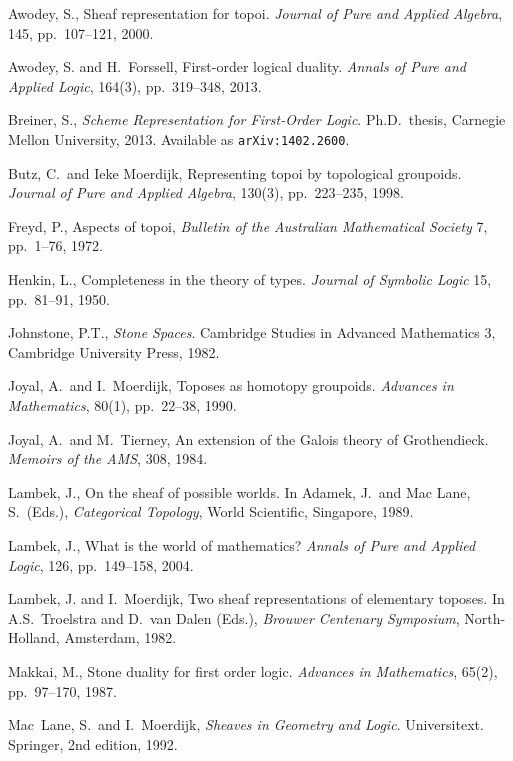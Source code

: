 \documentclass[12pt]{article}
\theoremstyle{remark}
\theoremstyle{definition}
\begin{document}
\begin{thebibliography}{300}

Awodey, S., Sheaf representation for topoi. 
\emph{Journal of Pure and Applied Algebra}, 145, pp.~107--121, 2000.

Awodey, S. and H.~Forssell, First-order logical duality. 
\emph{Annals of Pure and Applied Logic}, 164(3), pp.~319--348, 2013.

Breiner, S., \emph{Scheme Representation for First-Order Logic}. 
Ph.D.~thesis, Carnegie Mellon University, 2013.  Available as {\tt arXiv:1402.2600}.

Butz, C.\ and Ieke Moerdijk, Representing topoi by topological groupoids. 
\emph{Journal of Pure and Applied Algebra}, 130(3), pp.~223--235, 1998.

Freyd, P., Aspects of topoi, 
\emph{Bulletin of the Australian Mathematical Society} 7, pp.~1--76, 1972.
 
Henkin, L., Completeness in the theory of types. 
\emph{Journal of Symbolic Logic} 15, pp.~81--91, 1950.

Johnstone, P.T., \emph{Stone Spaces}. Cambridge Studies in Advanced Mathematics 3,
Cambridge University Press, 1982.

  Joyal, A.\ and I.~Moerdijk, Toposes as homotopy groupoids. 
\emph{Advances in Mathematics}, 80(1), pp.~22--38, 1990.

  Joyal, A.\  and M.\ Tierney, An extension of the Galois theory of Grothendieck.
\emph{Memoirs of the AMS}, 308, 1984.

Lambek, J., On the sheaf of possible worlds. 
In Adamek, J.\ and  Mac Lane, S.\ (Eds.), \emph{Categorical Topology}, World Scientific, Singapore, 1989.

 Lambek, J., What is the world of mathematics? 
\emph{Annals of Pure and Applied Logic}, 126, pp.~149--158, 2004.

Lambek, J. and I.~Moerdijk, Two sheaf representations of elementary toposes. 
In A.S.\ Troelstra and D.\ van Dalen (Eds.), \emph{Brouwer Centenary Symposium}, North-Holland, Amsterdam, 1982.
 
 Makkai, M., Stone duality for first order logic. 
 \emph{Advances in Mathematics}, 65(2), pp.~97--170,  1987.
 
Mac~Lane, S.\ and I.~Moerdijk, \emph{Sheaves in Geometry and Logic}. Universitext. Springer, 2nd edition, 1992.

\end{thebibliography}








\end{document}
